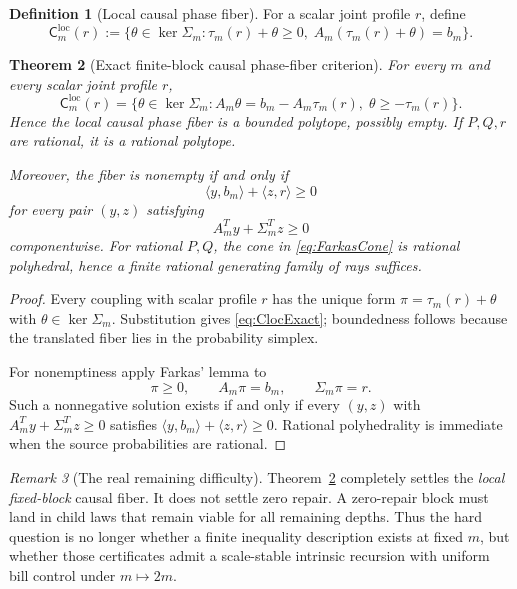 \documentclass[11pt,a4paper]{article}
\newtheorem{theorem}{Theorem}[section]
\theoremstyle{definition}
\newtheorem{definition}[theorem]{Definition}
\theoremstyle{remark}
\newtheorem{remark}[theorem]{Remark}
\begin{document}
\begin{definition}[Local causal phase fiber]
For a scalar joint profile \(r\), define
\begin{equation}
 \boxed{\mathsf C_m^{\mathrm{loc}}(r)
 :=\{\theta\in\ker\Sigma_m:
 \tau_m(r)+\theta\ge0,\;A_m(\tau_m(r)+\theta)=b_m\}.}
 \label{eq:Cloc}
\end{equation}
\end{definition}

\begin{theorem}[Exact finite-block causal phase-fiber criterion]
\label{thm:causal-farkas}
For every \(m\) and every scalar joint profile \(r\),
\begin{equation}
 \boxed{\mathsf C_m^{\mathrm{loc}}(r)=
 \{\theta\in\ker\Sigma_m:
 A_m\theta=b_m-A_m\tau_m(r),\;\theta\ge-\tau_m(r)\}.}
 \label{eq:ClocExact}
\end{equation}
Hence the local causal phase fiber is a bounded polytope, possibly empty.
If \(P,Q,r\) are rational, it is a rational polytope.

Moreover, the fiber is nonempty if and only if
\begin{equation}
 \boxed{\langle y,b_m\rangle+\langle z,r\rangle\ge0}
 \label{eq:FarkasCriterion}
\end{equation}
for every pair \((y,z)\) satisfying
\begin{equation}
 \boxed{A_m^Ty+\Sigma_m^Tz\ge0}
 \label{eq:FarkasCone}
\end{equation}
componentwise.  For rational \(P,Q\), the cone in
\eqref{eq:FarkasCone} is rational polyhedral, hence a finite rational
generating family of rays suffices.
\end{theorem}

\begin{proof}
Every coupling with scalar profile \(r\) has the unique form
\(\pi=\tau_m(r)+\theta\) with \(\theta\in\ker\Sigma_m\).  Substitution gives
\eqref{eq:ClocExact}; boundedness follows because the translated fiber lies in
the probability simplex.

For nonemptiness apply Farkas' lemma to
\[
 \pi\ge0,\qquad A_m\pi=b_m,\qquad\Sigma_m\pi=r.
\]
Such a nonnegative solution exists if and only if every \((y,z)\) with
\(A_m^Ty+\Sigma_m^Tz\ge0\) satisfies
\(\langle y,b_m\rangle+\langle z,r\rangle\ge0\).  Rational polyhedrality is
immediate when the source probabilities are rational.
\end{proof}

\begin{remark}[The real remaining difficulty]
Theorem~\ref{thm:causal-farkas} completely settles the \emph{local fixed-block}
causal fiber.  It does not settle zero repair.  A zero-repair block must land
in child laws that remain viable for all remaining depths.  Thus the hard
question is no longer whether a finite inequality description exists at fixed
\(m\), but whether those certificates admit a scale-stable intrinsic recursion
with uniform bill control under \(m\mapsto2m\).
\end{remark}
\end{document}
